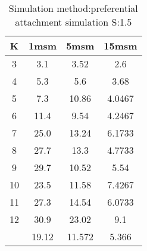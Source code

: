 \begin{table}[H]
\centering
\begin{tabular}{c|ccc}
K &1msm &5msm &15msm\\
\hline
3 & 3.1 & 3.52 & 2.6\\
4 & 5.3 & 5.6 & 3.68\\
5 & 7.3 & 10.86 & 4.0467\\
6 & 11.4 & 9.54 & 4.2467\\
7 & 25.0 & 13.24 & 6.1733\\
8 & 27.7 & 13.3 & 4.7733\\
9 & 29.7 & 10.52 & 5.54\\
10 & 23.5 & 11.58 & 7.4267\\
11 & 27.3 & 14.54 & 6.0733\\
12 & 30.9 & 23.02 & 9.1\\
\hline
& 19.12 & 11.572 & 5.366\\
\end{tabular}
\caption{Simulation method:preferential attachment simulation S:1.5}
\label{tab:s1.5}
\end{table}
